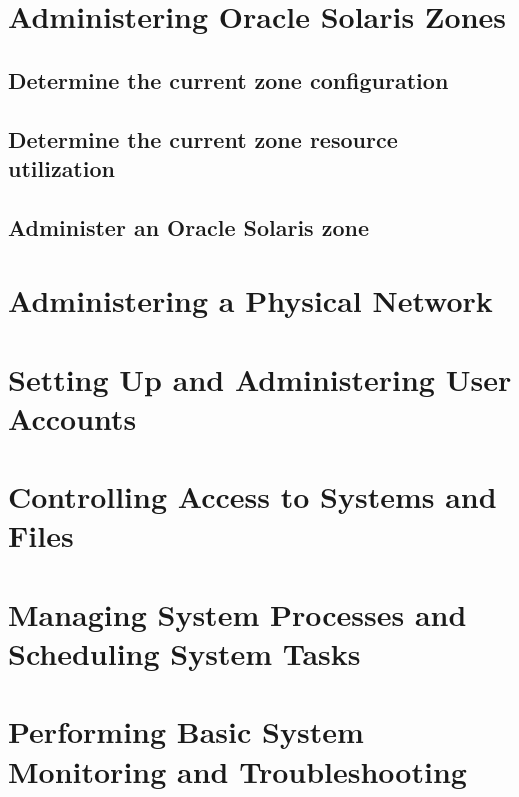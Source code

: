 \documentclass[10pt,a4paper,twoside]{report}
\begin{document}
\chapter{Administering Oracle Solaris Zones}
\section{Determine the current zone configuration}
\section{Determine the current zone resource utilization}
\section{Administer an Oracle Solaris zone}
\chapter{Administering a Physical Network}
\chapter{Setting Up and Administering User Accounts}
\chapter{Controlling Access to Systems and Files}
\chapter{Managing System Processes and Scheduling System Tasks}
\chapter{Performing Basic System Monitoring and Troubleshooting}
\end{document}
